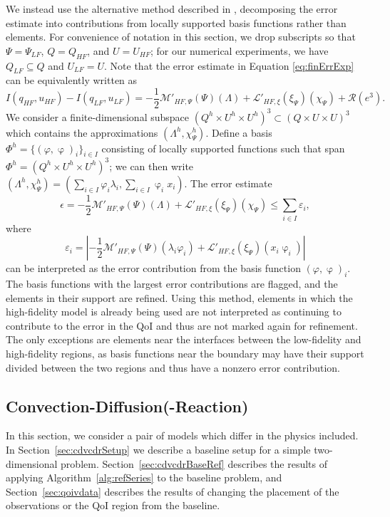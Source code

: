 We instead use the alternative method described in \cite{vanOpstaletal15}, decomposing the error estimate into contributions from locally supported basis functions rather than elements. For convenience of notation in this section, we drop subscripts so that $\Psi=\Psi_{LF}$, $Q=Q_{HF}$, and $U=U_{HF}$; for our numerical experiments, we have $Q_{LF}\subseteq Q$ and $U_{LF}=U$. Note that the error estimate in Equation \ref{eq:finErrExp} can be equivalently written as
%
\begin{equation}
I(q_{HF},u_{HF})-I(q_{LF},u_{LF})=-\frac{1}{2}\mathcal{M}'_{HF,\Psi}(\Psi)(\Lambda)+\mathcal{L}'_{HF,\xi}(\xi_\Psi)(\chi_\Psi)+\mathcal{R}(e^3). \nonumber
\end{equation}
%
We consider a finite-dimensional  subspace $(Q^h\times U^h\times U^h)^3 \subset (Q\times U\times U)^3$ which contains the approximations $(\Lambda^h,\chi_\Psi^h)$. Define a basis $\Phi^h=\{(\varphi,\upvarphi)_i\}_{i\in I}$ consisting of locally supported functions such that span $\Phi^h=(Q^h\times U^h\times U^h)^3$; we can then write $(\Lambda^h,\chi_\Psi^h)=(\sum_{i\in I}\varphi_i\lambda_i,\sum_{i\in I}\upvarphi_i x_i)$. The error estimate
%
\begin{equation}
\epsilon = -\frac{1}{2}\mathcal{M}'_{HF,\Psi}(\Psi)(\Lambda)+\mathcal{L}'_{HF,\xi}(\xi_\Psi)(\chi_\Psi) \leq \sum_{i\in I} \varepsilon_i,
\end{equation}
%
where
%
\begin{equation}\label{eq:basisblame}
\varepsilon_i = \left| -\frac{1}{2}\mathcal{M}'_{HF,\Psi}(\Psi)(\lambda_i\varphi_i)+\mathcal{L}'_{HF,\xi}(\xi_\Psi)(x_i\upvarphi_i) \right|
\end{equation}
%
can be interpreted as the error contribution from the basis function $(\varphi,\upvarphi)_i$. The basis functions with the largest error contributions are flagged, and the elements in their support are refined. Using this method, elements in which the high-fidelity model is already being used are not interpreted as continuing to contribute to the error in the QoI and thus are not marked again for refinement. The only exceptions are elements near the interfaces between the low-fidelity and high-fidelity regions, as basis functions near the boundary may have their support divided between the two regions and thus have a nonzero error contribution. 
\subsection{Convection-Diffusion(-Reaction)} \label{sec:cdvcdr}
In this section, we consider a pair of models which differ in the physics included. In Section~\ref{sec:cdvcdrSetup} we describe a baseline setup for a simple two-dimensional problem. Section~\ref{sec:cdvcdrBaseRef} describes the results of applying Algorithm~\ref{alg:refSeries} to the baseline problem, and Section~\ref{sec:qoivdata} describes the results of changing the placement of the observations or the QoI region from the baseline.
%
